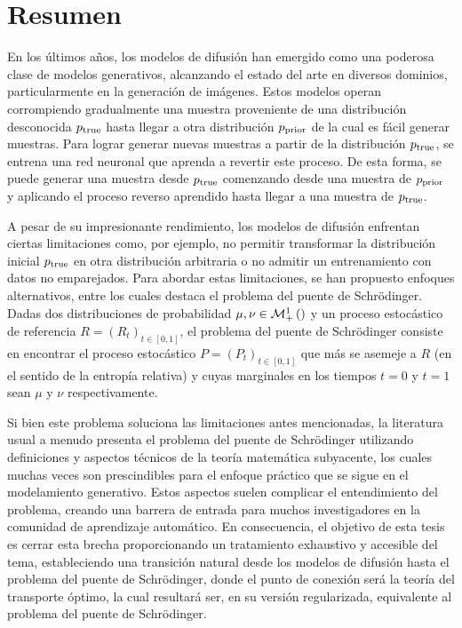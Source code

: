 \chapter*{Resumen}


En los últimos años, los modelos de difusión han emergido como una poderosa clase de modelos generativos, alcanzando el estado del arte en diversos dominios, particularmente en la generación de imágenes. Estos modelos operan corrompiendo gradualmente una muestra proveniente de una distribución desconocida $p_{\operatorname{true}}$ hasta llegar a otra distribución $p_{\operatorname{prior}}$ de la cual es fácil generar muestras. Para lograr generar nuevas muestras a partir de la distribución $p_{\operatorname{true}}$, se entrena una red neuronal que aprenda a revertir este proceso. De esta forma, se puede generar una muestra desde $p_{\operatorname{true}}$ comenzando desde una muestra de $p_{\operatorname{prior}}$ y aplicando el proceso reverso aprendido hasta llegar a una muestra de $p_{\operatorname{true}}$.

A pesar de su impresionante rendimiento, los modelos de difusión enfrentan ciertas limitaciones como, por ejemplo, no permitir transformar la distribución inicial $p_{\operatorname{true}}$ en otra distribución arbitraria o no admitir un entrenamiento con datos no emparejados. Para abordar estas limitaciones, se han propuesto enfoques alternativos, entre los cuales destaca el problema del puente de Schrödinger. Dadas dos distribuciones de probabilidad $\mu,\nu\in\mathcal{M}_+^1\left(\right)$ y un proceso estocástico de referencia $R=(R_t)_{t\in[0,1]}$, el problema del puente de Schrödinger consiste en encontrar el proceso estocástico $P=(P_t)_{t\in[0,1]}$ que más se asemeje a $R$ (en el sentido de la entropía relativa) y cuyas marginales en los tiempos $t=0$ y $t=1$ sean $\mu$ y $\nu$ respectivamente.

Si bien este problema soluciona las limitaciones antes mencionadas, la literatura usual a menudo presenta el problema del puente de Schrödinger utilizando definiciones y aspectos técnicos de la teoría matemática subyacente, los cuales muchas veces son prescindibles para el enfoque práctico que se sigue en el modelamiento generativo. Estos aspectos suelen complicar el entendimiento del problema, creando una barrera de entrada para muchos investigadores en la comunidad de aprendizaje automático. En consecuencia, el objetivo de esta tesis es cerrar esta brecha proporcionando un tratamiento exhaustivo y accesible del tema, estableciendo una transición natural desde los modelos de difusión hasta el problema del puente de Schrödinger, donde el punto de conexión será la teoría del transporte óptimo, la cual resultará ser, en su versión regularizada, equivalente al problema del puente de Schrödinger.


